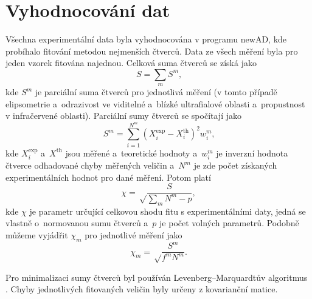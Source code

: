 \section{Vyhodnocování dat}
Všechna experimentální data byla vyhodnocována v programu newAD, kde probíhalo fitování metodou nejmenších čtverců. Data ze všech měření byla pro jeden vzorek fitována najednou. Celková suma čtverců se získá jako
%
\begin{equation} S = \sum_m S^m \text{,}\end{equation}
%
kde $S^m$ je parciální suma čtverců pro jednotlivá měření (v tomto případě elipsometrie a~odrazivost ve viditelné a~blízké ultrafialové oblasti a~propustnost v infračervené oblasti). Parciální sumy čtverců se spočítají jako
%
\begin{equation} S^m = \sum_{i=1}^{N^m} (X_i^\mathrm{exp} - X_i^\mathrm{th})^2 w_i^m \text{,} \end{equation}
%
kde $X_i^\mathrm{exp}$ a~$X^\mathrm{th}$ jsou měřené a~teoretické hodnoty a~$w_i^m$ je inverzní hodnota čtverce odhadované chyby měřených veličin a~$N^m$ je zde počet získaných experimentálních hodnot pro dané měření. Potom platí \cite{Franta2011}
%
\begin{equation} \chi = \sqrt \frac{S}{\sum_m N^m - p} \mathrm{,}\end{equation}
kde $\chi$ je parametr určující celkovou shodu fitu s experimentálními daty, jedná se vlastně o~normovanou sumu čtverců a~$p$ je počet volných parametrů. Podobně můžeme vyjádřit $\chi_m$ pro jednotlivé měření jako
%
\begin{equation} \chi_m = \sqrt \frac{S^m}{f^m N^m} \mathrm{.}\end{equation}

Pro minimalizaci sumy čtverců byl používán Levenberg--Marquardtův algoritmus \cite{Marquardt63, More78}.  
Chyby jednotlivých fitovaných veličin byly určeny z kovarianční matice.

\cleardoublepage
